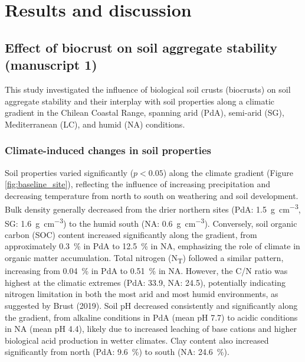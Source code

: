 \chapter{Results and discussion}

\section[Effect of biocrust on soil aggregate stability]{Effect of biocrust on soil aggregate stability (manuscript 1)}
\label{sec:BiocrustOnAggregateStability }

This study investigated the influence of biological soil crusts (biocrusts) on soil aggregate stability and their interplay with soil properties along a climatic gradient in the Chilean Coastal Range, spanning arid (PdA), semi-arid (SG), Mediterranean (LC), and humid (NA) conditions.

\subsection{Climate-induced changes in soil properties}
\label{sec:ClimateInducedSoil}

Soil properties varied significantly ($p < 0.05$) along the climate gradient (Figure \ref{fig:baseline_site}), reflecting the influence of increasing precipitation and decreasing temperature from north to south on weathering and soil development. Bulk density generally decreased from the drier northern sites (PdA: \SI{1.5}{\gram\per\cubic\centi\meter}, SG: \SI{1.6}{\gram\per\cubic\centi\meter}) to the humid south (NA: \SI{0.6}{\gram\per\cubic\centi\meter}). Conversely, soil organic carbon (SOC) content increased significantly along the gradient, from approximately \SI{0.3}{\percent} in PdA to \SI{12.5}{\percent} in NA, emphasizing the role of climate in organic matter accumulation. Total nitrogen (N\textsubscript{T}) followed a similar pattern, increasing from \SI{0.04}{\percent} in PdA to \SI{0.51}{\percent} in NA. However, the C/N ratio was highest at the climatic extremes (PdA: 33.9, NA: 24.5), potentially indicating nitrogen limitation in both the most arid and most humid environments, as suggested by Brust (2019). Soil pH decreased consistently and significantly along the gradient, from alkaline conditions in PdA (mean pH 7.7) to acidic conditions in NA (mean pH 4.4), likely due to increased leaching of base cations and higher biological acid production in wetter climates. Clay content also increased significantly from north (PdA: \SI{9.6}{\percent}) to south (NA: \SI{24.6}{\percent}).


